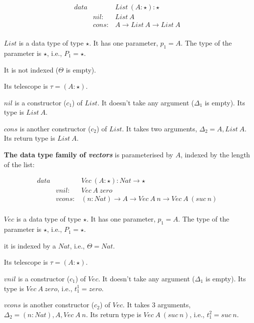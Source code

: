 \documentclass[acmsmall]{acmart}
\begin{document}
\begin{equation*}
  \begin{aligned}
    data &       & List \: (A:\star) : \star     \\
         & nil:  & List \: A                     \\
         & cons: & A \to List \: A \to List \: A \\
  \end{aligned}
\end{equation*}

$List$ is a data type of type $\star$. It has one parameter, $p_1 = A$. The type of the parameter is $\star$, i.e., $P_1 = \star$. 

It is not indexed ($\Theta$ is empty).

Its telescope is $\tau = (A:\star)$. 

$nil$ is a constructor ($c_1$) of $List$. It doesn't take any argument ($\Delta_1$ is empty). Its type is $List \: A$.

$cons$ is another constructor ($c_2$) of $List$. It takes two arguments, $\Delta_2 = A, List \: A$. Its return type is $List \: A$.

\textbf{The data type family of \emph{vectors}} is parameterised by $A$, indexed by the length of the list:

\begin{equation*}
  \begin{aligned}
    data &        & Vec \: (A:\star) : Nat \to \star                             \\
         & vnil:  & Vec \: A \: zero                                             \\
         & vcons: & (n : Nat) \to A \to Vec \: A \: n \to Vec \: A \: (suc \: n) \\
  \end{aligned}
\end{equation*}

$Vec$ is a data type of type $\star$. It has one parameter, $p_1 = A$. The type of the parameter is $\star$, i.e., $P_1 = \star$.

it is indexed by a $Nat$, i.e., $\Theta = Nat$.

Its telescope is $\tau = (A : \star)$.

$vnil$ is a constructor ($c_1$) of $Vec$. It doesn't take any argument ($\Delta_1$ is empty). Its type is $Vec \: A \: zero$, i.e., $t_1^1 = zero$.

$vcons$ is another constructor ($c_2$) of $Vec$. It takes 3 arguments, $\Delta_2 = (n:Nat), A, Vec \: A \: n$. Its return type is $Vec \: A \: (suc \: n)$, i.e., $t^2_1 = suc \: n$. 
\end{document}
